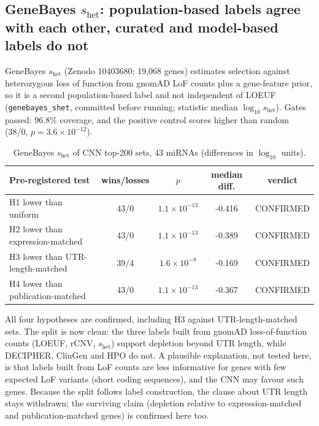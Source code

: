 \subsection{GeneBayes $s_\mathrm{het}$: population-based labels agree with each other, curated and model-based labels do not}
GeneBayes $s_\mathrm{het}$ (Zenodo 10403680; 19,068 genes) estimates selection against heterozygous loss of function from gnomAD LoF counts plus a gene-feature prior, so it is a second population-based label and not independent of LOEUF (\texttt{genebayes\_shet}, committed before running; statistic median $\log_{10} s_\mathrm{het}$). Gates passed: 96.8\% coverage, and the positive control scores higher than random (38/0, $p=3.6\times10^{-12}$).
\begin{table}[h]\centering\small\begin{tabular}{lcccc}\hline Pre-registered test & wins/losses & $p$ & median diff. & verdict\\\hline
H1 lower than uniform & 43/0 & $1.1\times10^{-13}$ & -0.416 & CONFIRMED \\
H2 lower than expression-matched & 43/0 & $1.1\times10^{-13}$ & -0.389 & CONFIRMED \\
H3 lower than UTR-length-matched & 39/4 & $1.6\times10^{-8}$ & -0.169 & CONFIRMED \\
H4 lower than publication-matched & 43/0 & $1.1\times10^{-13}$ & -0.367 & CONFIRMED \\
\hline\end{tabular}\caption{GeneBayes $s_\mathrm{het}$ of CNN top-200 sets, 43 miRNAs (differences in $\log_{10}$ units).}\label{tab:genebayes}\end{table}
All four hypotheses are confirmed, including H3 against UTR-length-matched sets. The split is now clean: the three labels built from gnomAD loss-of-function counts (LOEUF, rCNV, $s_\mathrm{het}$) support depletion beyond UTR length, while DECIPHER, ClinGen and HPO do not. A plausible explanation, not tested here, is that labels built from LoF counts are less informative for genes with few expected LoF variants (short coding sequences), and the CNN may favour such genes. Because the split follows label construction, the clause about UTR length stays withdrawn; the surviving claim (depletion relative to expression-matched and publication-matched genes) is confirmed here too.
